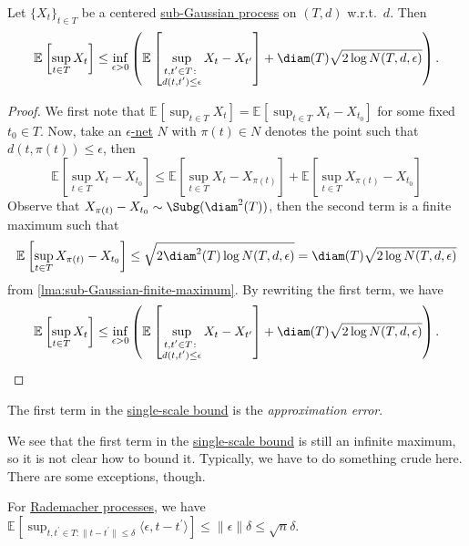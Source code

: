 \begin{lemma}\label{lma:single-scale-bound}
	Let \(\{ X_t \} _{t\in T}\) be a centered \hyperref[def:sub-Gaussian-process]{sub-Gaussian process} on \((T, d)\) w.r.t.\ \(d\). Then
	\[
		\mathbb{E}_{}\left[\sup _{t\in T} X_t \right]
		\leq \inf _{\epsilon > 0} \left( \mathbb{E}_{}\left[\sup _{\substack{t, t^{\prime} \in T\colon \\ d(t, t^{\prime} ) \leq \epsilon }} X_t - X_{t^{\prime} } \right] + \diam(T) \sqrt{2 \log N(T, d, \epsilon )} \right) .
	\]
\end{lemma}
\begin{proof}
	We first note that \(\mathbb{E}_{}\left[\sup _{t\in T} X_t \right] = \mathbb{E}_{}\left[\sup _{t\in T} X_t - X_{t_0} \right]  \) for some fixed \(t_0\in T\). Now, take an \hyperref[def:eps-net]{\(\epsilon\)-net} \(N\) with \(\pi (t) \in N\) denotes the point such that \(d(t, \pi (t)) \leq \epsilon \), then
	\[
		\mathbb{E}_{}\left[\sup _{t\in T} X_t - X_{t_0} \right]
		\leq \mathbb{E}_{}\left[\sup _{t\in T} X_t - X_{\pi (t)} \right] + \mathbb{E}_{}\left[\sup _{t\in T} X_{\pi (t)} - X_{t_0} \right]
	\]
	Observe that \(X_{\pi (t)} - X_{t_0} \sim \Subg(\diam^2(T) )\), then the second term is a finite maximum such that
	\[
		\mathbb{E}_{}\left[\sup _{t\in T} X_{\pi (t)} - X_{t_0} \right]
		\leq \sqrt{2 \diam^2(T) \log N(T, d, \epsilon )}
		= \diam(T) \sqrt{2 \log N(T, d, \epsilon )}
	\]
	from \autoref{lma:sub-Gaussian-finite-maximum}. By rewriting the first term, we have
	\[
		\mathbb{E}_{}\left[\sup _{t\in T} X_t \right]
		\leq \inf _{\epsilon > 0} \left( \mathbb{E}_{}\left[\sup _{\substack{t, t^{\prime} \in T\colon \\ d(t, t^{\prime} ) \leq \epsilon }} X_t - X_{t^{\prime} } \right] + \diam(T) \sqrt{2 \log N(T, d, \epsilon )} \right) .
	\]
\end{proof}

\begin{notation}
	The first term in the \hyperref[lma:single-scale-bound]{single-scale bound} is the \emph{approximation error}.
\end{notation}

We see that the first term in the \hyperref[lma:single-scale-bound]{single-scale bound} is still an infinite maximum, so it is not clear how to bound it. Typically, we have to do something crude here. There are some exceptions, though.

\begin{eg}
	For \hyperref[eg:Rademacher-process]{Rademacher processes}, we have \(\mathbb{E}_{}\left[\sup _{t, t^{\prime} \in T \colon \lVert t - t^{\prime} \rVert \leq \delta } \langle \epsilon , t - t^{\prime}  \rangle  \right] \leq \lVert \epsilon \rVert \delta \leq \sqrt{n} \delta \).
\end{eg}

